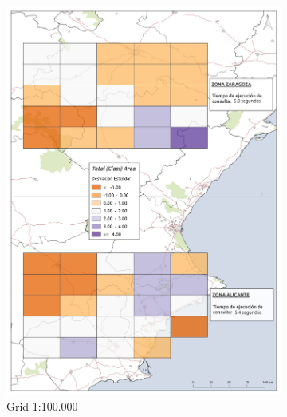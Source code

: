 \begin{figure}
\begin{subfigure}[b]{0.4\textwidth}
    \includegraphics[width=\textwidth]{ResultadosyDiscusion/Figs/Results/c_100.pdf}
    \caption{Grid 1:100.000}
    \label{fig:c_100}
  \end{subfigure}
    \begin{subfigure}[b]{0.4\textwidth}

\end{subfigure}
\end{figure}
